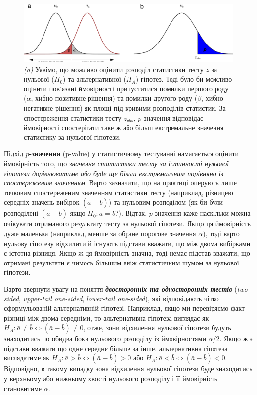 \documentclass[
  11pt,
]{book}
\begin{document}
\begin{figure}
\centering
\includegraphics{bookdown-demo_files/figure-latex/fig-3-12-1.pdf}
\caption{\label{fig:fig-3-12}\emph{(a)} Уявімо, що можливо оцінити розподіл статистики тесту \(z\) за нульової (\(H_0\)) та альтернативної (\(H_A\)) гіпотез. Тоді було би можливо оцінити пов'язані ймовірності припуститися помилки першого роду (\(\alpha\), хибно-позитивне рішення) та помилки другого роду (\(\beta\), хибно-негативне рішення) як площі під кривими розподілів статистик. За спостереження статистики тесту \(z_{obs}\), \(p\)-значення відповідає ймовірності спостерігати таке ж або більш екстремальне значення статистику за нульової гіпотези.}
\end{figure}

Підхід \textbf{\(p\)-значення} (p-value) у статистичному тестуванні намагається оцінити ймовірність того, що \emph{значення статистики тесту за істинності нульової гіпотези дорівнюватиме або буде ще більш екстремальним порівняно із спостереженим значенням}. Варто зазначити, що на практиці оперують лише точковим спостереженим значенням статистики тесту (наприклад, різницею середніх значень вибірок \((\bar{a} - \bar{b})\)) та нульовим розподілом (як би були розподілені \((\bar{a} - \bar{b})\) якщо \(H_0: \bar{a} = \bar{b}\)?). Відтак, \(p\)-значення каже наскільки можна очікувати отриманого результату тесту за нульової гіпотези. Якщо ця ймовірність дуже маленька (наприклад, менше за обране порогове значення \(\alpha\)), тоді варто нульову гіпотезу відхилити й існують підстави вважати, що між двома вибірками є істотна різниця. Якщо ж ця ймовірність значна, тоді немає підстав вважати, що отримані результати є чимось більшим аніж статистичним шумом за нульової гіпотези.

Варто звернути увагу на поняття \textbf{\emph{двосторонніх та односторонніх тестів}} (\emph{two-sided}, \emph{upper-tail one-sided}, \emph{lower-tail one-sided}), які відповідають чітко сформульованій альтернативній гіпотезі. Наприклад, якщо ми перевіряємо факт різниці між двома середніми, то альтернативна гіпотеза виглядає як \(H_A: \bar{a} \neq \bar{b} \Leftrightarrow (\bar{a} - \bar{b}) \neq {0}\), отже, зони відхилення нульової гіпотези будуть знаходитись по обидва боки нульового розподілу із ймовірностями \(\alpha/2\). Якщо ж є підстави вважати що одне середнє більше за інше, альтернативна гіпотеза виглядатиме як \(H_A: \bar{a} > \bar{b} \Leftrightarrow (\bar{a} - \bar{b}) > {0}\) або \(H_A: \bar{a} < \bar{b} \Leftrightarrow (\bar{a} - \bar{b}) < {0}\). Відповідно, в такому випадку зона відхилення нульової гіпотези буде знаходитись у верхньому або нижньому хвості нульового розподілу і її ймовірність становитиме \(\alpha\).
\end{document}
